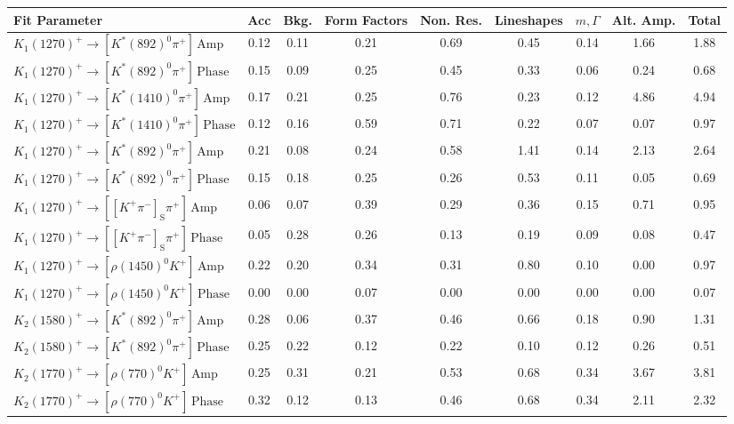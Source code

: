 \begin{tabular}{l  c  c  c  c  c  c  c  | c }
\hline
\hline
Fit Parameter & Acc & Bkg. & Form Factors & Non. Res. & Lineshapes & $m,\Gamma$ & Alt. Amp. &  Total  \\ 
\hline
$K_{1}(1270)^{+}\rightarrow \left[K^{*}(892)^{0}\pi^{+}\right]\,\text{Amp}$ & 0.12 & 0.11 & 0.21 & 0.69 & 0.45 & 0.14 & 1.66 & 1.88 \\ 
$K_{1}(1270)^{+}\rightarrow \left[K^{*}(892)^{0}\pi^{+}\right]\,\text{Phase}$ & 0.15 & 0.09 & 0.25 & 0.45 & 0.33 & 0.06 & 0.24 & 0.68 \\ 
$K_{1}(1270)^{+}\rightarrow \left[K^{*}(1410)^{0}\pi^{+}\right]\,\text{Amp}$ & 0.17 & 0.21 & 0.25 & 0.76 & 0.23 & 0.12 & 4.86 & 4.94 \\ 
$K_{1}(1270)^{+}\rightarrow \left[K^{*}(1410)^{0}\pi^{+}\right]\,\text{Phase}$ & 0.12 & 0.16 & 0.59 & 0.71 & 0.22 & 0.07 & 0.07 & 0.97 \\ 
$K_{1}(1270)^{+}\rightarrow \left[K^{*}(892)^{0}\pi^{+}\right]\,\text{Amp}$ & 0.21 & 0.08 & 0.24 & 0.58 & 1.41 & 0.14 & 2.13 & 2.64 \\ 
$K_{1}(1270)^{+}\rightarrow \left[K^{*}(892)^{0}\pi^{+}\right]\,\text{Phase}$ & 0.15 & 0.18 & 0.25 & 0.26 & 0.53 & 0.11 & 0.05 & 0.69 \\ 
$K_{1}(1270)^{+}\rightarrow \left[\left[K^{+}\pi^{-}\right]_{\text{S}}\pi^{+}\right]\,\text{Amp}$ & 0.06 & 0.07 & 0.39 & 0.29 & 0.36 & 0.15 & 0.71 & 0.95 \\ 
$K_{1}(1270)^{+}\rightarrow \left[\left[K^{+}\pi^{-}\right]_{\text{S}}\pi^{+}\right]\,\text{Phase}$ & 0.05 & 0.28 & 0.26 & 0.13 & 0.19 & 0.09 & 0.08 & 0.47 \\ 
$K_{1}(1270)^{+}\rightarrow \left[\rho(1450)^{0}K^{+}\right]\,\text{Amp}$ & 0.22 & 0.20 & 0.34 & 0.31 & 0.80 & 0.10 & 0.00 & 0.97 \\ 
$K_{1}(1270)^{+}\rightarrow \left[\rho(1450)^{0}K^{+}\right]\,\text{Phase}$ & 0.00 & 0.00 & 0.07 & 0.00 & 0.00 & 0.00 & 0.00 & 0.07 \\ 
$K_{2}(1580)^{+}\rightarrow \left[K^{*}(892)^{0}\pi^{+}\right]\,\text{Amp}$ & 0.28 & 0.06 & 0.37 & 0.46 & 0.66 & 0.18 & 0.90 & 1.31 \\ 
$K_{2}(1580)^{+}\rightarrow \left[K^{*}(892)^{0}\pi^{+}\right]\,\text{Phase}$ & 0.25 & 0.22 & 0.12 & 0.22 & 0.10 & 0.12 & 0.26 & 0.51 \\ 
$K_{2}(1770)^{+}\rightarrow \left[\rho(770)^{0}K^{+}\right]\,\text{Amp}$ & 0.25 & 0.31 & 0.21 & 0.53 & 0.68 & 0.34 & 3.67 & 3.81 \\ 
$K_{2}(1770)^{+}\rightarrow \left[\rho(770)^{0}K^{+}\right]\,\text{Phase}$ & 0.32 & 0.12 & 0.13 & 0.46 & 0.68 & 0.34 & 2.11 & 2.32 \\ 

\end{tabular}
